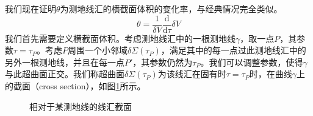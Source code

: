 \documentclass[hyperref, UTF8, a4paper]{ctexart}
\begin{document}
我们现在证明$\theta $为测地线汇的横截面体积的变化率，与经典情况完全类似。
\begin{equation*}
	\theta =\frac{1}{\delta V}\frac{\mathrm{d}}{\mathrm{d} \tau } \delta V
\end{equation*}
我们首先需要定义横截面体积。考虑测地线汇中的一根测地线$\gamma $，取一点$P$，其参数$\tau =\tau _{P}$。考虑$P$周围一个小邻域$\delta \Sigma ( \tau _{P})$，满足其中的每一点过此测地线汇中的另外一根测地线，并且在每一点$P'$，其参数仍然为$\tau _{P}$。我们可以调整参数，使得$\gamma $与此超曲面正交。我们称超曲面$\delta \Sigma ( \tau _{P})$为该线汇在固有时$\tau =\tau _{P}$时，在曲线$\gamma $上的截面（cross section），如图\ref{fig:cross-section}所示。

\begin{figure}
	\centering
	
	\caption{相对于某测地线的线汇截面}
	\label{fig:cross-section}
\end{figure}
\end{document}
